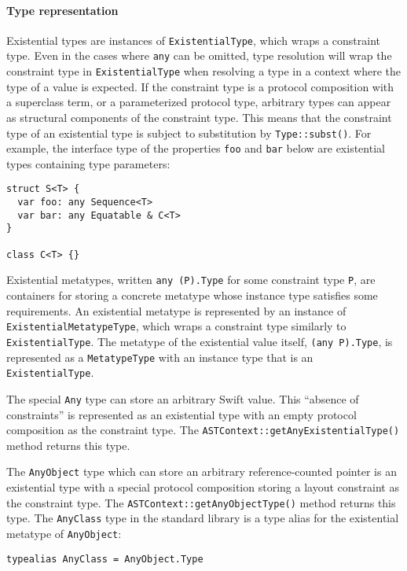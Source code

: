 \documentclass[../generics]{subfiles}
\begin{document}
\paragraph{Type representation}
Existential types are instances of \texttt{ExistentialType}, which wraps a constraint type. Even in the cases where \texttt{any} can be omitted, type resolution will wrap the constraint type in \texttt{ExistentialType} when resolving a type in a context where the type of a value is expected. If the constraint type is a protocol composition with a superclass term, or a parameterized protocol type, arbitrary types can appear as structural components of the constraint type. This means that the constraint type of an existential type is subject to substitution by \texttt{Type::subst()}. For example, the interface type of the properties \texttt{foo} and \texttt{bar} below are existential types containing type parameters:
\begin{Verbatim}
struct S<T> {
  var foo: any Sequence<T>
  var bar: any Equatable & C<T>
}

class C<T> {}
\end{Verbatim}

Existential metatypes, written \texttt{any (P).Type} for some constraint type \texttt{P}, are containers for storing a concrete metatype whose instance type satisfies some requirements. An existential metatype is represented by an instance of \texttt{ExistentialMetatypeType}, which wraps a constraint type similarly to \texttt{ExistentialType}. The metatype of the existential value itself, \texttt{(any P).Type}, is represented as a \texttt{MetatypeType} with an instance type that is an \texttt{ExistentialType}.

The special \texttt{Any} type can store an arbitrary Swift value. This ``absence of constraints'' is represented as an existential type with an empty protocol composition as the constraint type. The \texttt{ASTContext::getAnyExistentialType()} method returns this type.

The \texttt{AnyObject} type which can store an arbitrary reference-counted pointer is an existential type with a special protocol composition storing a layout constraint as the constraint type. The \texttt{ASTContext::getAnyObjectType()} method returns this type. The \texttt{AnyClass} type in the standard library is a type alias for the existential metatype of \texttt{AnyObject}:
\begin{Verbatim}
typealias AnyClass = AnyObject.Type
\end{Verbatim}
\end{document}
